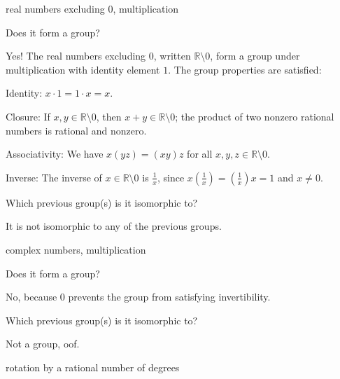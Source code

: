 \documentclass[../key.tex]{subfiles}
\begin{document}
\begin{inner_problem}
\item real numbers excluding $0$, multiplication
\end{inner_problem}

\begin{iinner_problem}[start=1]
\item Does it form a group?
\end{iinner_problem}

\noindent Yes! The real numbers excluding $0$, written $\mathbb{R} \setminus {0}$, form a group under multiplication with identity element $1$. The group properties are satisfied:

Identity: $x\cdot 1=1\cdot x=x$.

Closure: If $x,y\in \mathbb{R} \setminus {0}$, then $x+y\in \mathbb{R} \setminus {0}$; the product of two nonzero rational numbers is rational and nonzero.

Associativity: We have $x(yz)=(xy)z$ for all $x,y,z \in \mathbb{R} \setminus {0}$.

Inverse: The inverse of $x\in \mathbb{R} \setminus {0}$ is $\frac{1}{x}$, since $x\left(\frac{1}{x}\right)=\left(\frac{1}{x}\right)x=1$ and $x\neq 0$.

\begin{iinner_problem}
\item Which previous group(s) is it isomorphic to?
\end{iinner_problem}

\noindent It is not isomorphic to any of the previous groups.

\begin{inner_problem}
\item complex numbers, multiplication
\end{inner_problem}

\begin{iinner_problem}[start=1]
\item Does it form a group?
\end{iinner_problem}

\noindent No, because $0$ prevents the group from satisfying invertibility.

\begin{iinner_problem}
\item Which previous group(s) is it isomorphic to?
\end{iinner_problem}

\noindent Not a group, oof.

\begin{inner_problem}
\item rotation by a rational number of degrees
\end{inner_problem}
\end{document}
